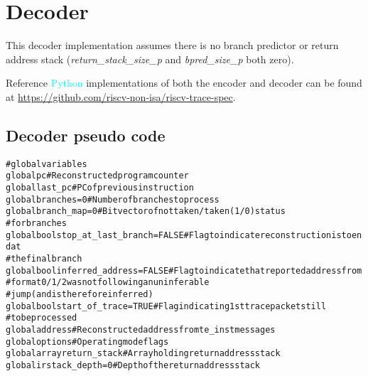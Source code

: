 \chapter{Decoder}

This decoder implementation assumes there is no branch predictor or return address 
stack (\textit{return\_stack\_size\_p} and \textit{bpred\_size\_p} both zero).

Reference \textcolor{cyan}{Python} implementations of both the encoder and decoder can be found at 
\href{https://github.com/riscv-non-isa/riscv-trace-spec}{https://github.com/riscv-non-isa/riscv-trace-spec}.

\section{Decoder pseudo code}

\begin{alltt}
# global variables
global       pc                          # Reconstructed program counter
global       last_pc                     # PC of previous instruction
global       branches = 0                # Number of branches to process
global       branch_map = 0              # Bit vector of not taken/taken (1/0) status
                                         #   for branches
global bool  stop_at_last_branch = FALSE # Flag to indicate reconstruction is to end at
                                         #   the final branch
global bool  inferred_address = FALSE    # Flag to indicate that reported address from
                                         #   format 0/1/2 was not following an uninferable
                                         #   jump (and is therefore inferred)
global bool  start_of_trace = TRUE       # Flag indicating 1st trace packet still
                                         #   to be processed
global       address                     # Reconstructed address from te_inst messages
global       options                     # Operating mode flags
global array return_stack                # Array holding return address stack
global       irstack_depth = 0           # Depth of the return address stack
\end{alltt}

\pagebreak


